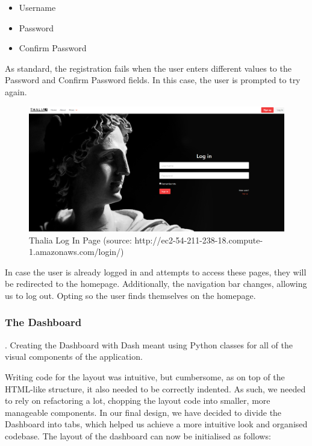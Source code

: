 \documentclass[main.tex]{subfiles}
\begin{document}
\begin{itemize}
    \item Username
    \item Password
    \item Confirm Password
\end{itemize}

As standard, the registration fails when the user enters different values to the Password and Confirm Password fields. In this case, the user is prompted to try again.

\begin{figure}[H]
   \centering
   \includegraphics[width=\textwidth]{08Appendices/081User/081Pictures/login.png}
   \caption{Thalia Log In Page (source: http://ec2-54-211-238-18.compute-1.amazonaws.com/login/)}
   \label{thalia_login}
\end{figure}

In case the user is already logged in and attempts to access these pages, they will be redirected to the homepage. Additionally, the navigation bar changes, allowing us to log out. Opting so the user finds themselves on the homepage.

\subsubsection{The Dashboard}

 \cite{dash_layout}. Creating the Dashboard with Dash meant using Python classes for all of the visual components of the application. 

Writing code for the layout was intuitive, but cumbersome, as on top of the HTML-like structure, it also needed to be correctly indented. As such, we needed to rely on refactoring a lot, chopping the layout code into smaller, more manageable components. In our final design, we have decided to divide the Dashboard into tabs, which helped us achieve a more intuitive look and organised codebase. The layout of the dashboard can now be initialised as follows:
\end{document}
